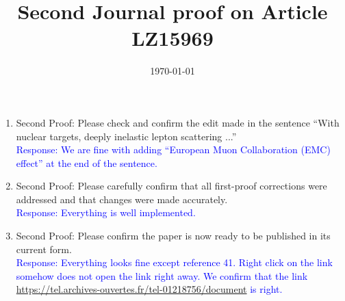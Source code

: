 \documentclass[a4paper,11pt,twoside]{article}
\title{Second Journal proof on Article LZ15969}
\date{\today}
\begin{document}
\maketitle


\begin{enumerate}

\item Second Proof: Please check and confirm the edit made in the sentence 
   ``With nuclear targets, deeply inelastic lepton scattering
...''\\
   \textcolor{blue}{Response: We are fine with adding ``European Muon 
      Collaboration (EMC) effect'' at the end of the sentence.} 

\item  Second Proof: Please carefully confirm that all first-proof corrections 
   were addressed and that changes were made accurately. \\
   \textcolor{blue}{Response: Everything is well implemented.    } 


      
\item Second Proof: Please confirm the paper is now ready to be published in 
   its current form.\\  \textcolor{blue}{Response: Everything looks fine except 
      reference 41. Right click on the link somehow does not open the link 
      right away. We confirm that the link 
      \url{https://tel.archives-ouvertes.fr/tel-01218756/document} is right.  } 
   



\end{enumerate}
\end{document}
